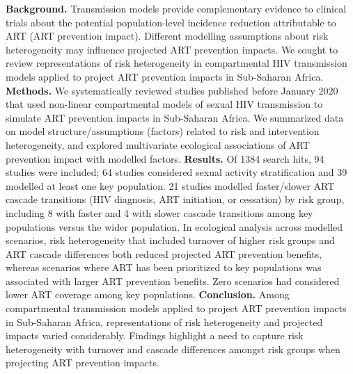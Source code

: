 \textbf{Background.}
Transmission models provide complementary evidence to clinical trials about
the potential population-level incidence reduction attributable to ART (ART prevention impact).
Different modelling assumptions about risk heterogeneity may influence projected ART prevention impacts.
We sought to review representations of risk heterogeneity in compartmental HIV transmission models
applied to project ART prevention impacts in Sub-Saharan Africa.
\textbf{Methods.}
We systematically reviewed studies published before January 2020 that used
non-linear compartmental models of sexual HIV transmission
to simulate ART prevention impacts in Sub-Saharan Africa.
We summarized data on model structure/assumptions (factors) related to risk and intervention heterogeneity,
and explored multivariate ecological associations of ART prevention impact with modelled factors.
\textbf{Results.}
Of 1384 search hits, 94 studies were included;
64 studies considered sexual activity stratification and 39 modelled at least one key population.
21 studies modelled faster/slower ART cascade transitions (HIV diagnosis, ART initiation, or cessation) by risk group,
including 8 with faster and 4 with slower cascade transitions among key populations versus the wider population.
In ecological analysis across modelled scenarios, risk heterogeneity that included turnover of higher risk groups and ART cascade differences 
both reduced projected ART prevention benefits, whereas scenarios where
ART has been prioritized to key populations was associated with larger ART prevention benefits. %
Zero scenarios had considered lower ART coverage among key populations. %
\textbf{Conclusion.}
Among compartmental transmission models applied to project ART prevention impacts in Sub-Saharan Africa,
representations of risk heterogeneity and projected impacts varied considerably. Findings highlight a need to 
capture risk heterogeneity with turnover and 
cascade differences amongst risk groups when projecting ART prevention impacts.